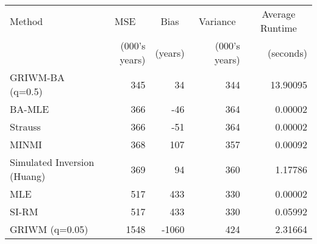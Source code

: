 
\begin{tabular}{lrrrr}
\toprule
\multicolumn{1}{l}{Method} & \multicolumn{1}{c}{MSE} & \multicolumn{1}{c}{Bias} & \multicolumn{1}{c}{Variance} & \multicolumn{1}{c}{Average Runtime} \\
 & (000's years) & (years) & (000's years) & (seconds)\\
\midrule
GRIWM-BA (q=0.5) & 345 & 34 & 344 & 13.90095\\
BA-MLE & 366 & -46 & 364 & 0.00002\\
Strauss & 366 & -51 & 364 & 0.00002\\
MINMI & 368 & 107 & 357 & 0.00092\\
Simulated Inversion (Huang) & 369 & 94 & 360 & 1.17786\\
\addlinespace
MLE & 517 & 433 & 330 & 0.00002\\
SI-RM & 517 & 433 & 330 & 0.05992\\
GRIWM (q=0.05) & 1548 & -1060 & 424 & 2.31664\\
\bottomrule
\end{tabular}
